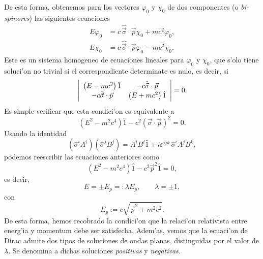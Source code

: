 De esta forma, obtenemos para los vectores $\varphi_0$ y $\chi_0$ de dos
componentes (o \textit{bi-spinores}) las siguientes ecuaciones
\begin{align}
E\varphi_0 & =c\,\hat{\vec{\sigma}}\cdot\vec{p}\chi_0+mc^2\varphi_0,
\label{s1}\\
E\chi_0 & =c\,\hat{\vec{\sigma}}\cdot\vec{p}\varphi_0-mc^2\chi_0 
\label{s2}.
\end{align}
Este es un sistema homogeneo de ecuaciones lineales para $\varphi_0$ y $\chi_0$,
que s'olo tiene soluci'on no trivial si el correspondiente determinate es nulo,
es decir, si
\begin{equation}
\left|
\begin{array}
[c]{cc}%
\left( E-mc^2\right) \hat{1} & -c\hat{\vec{\sigma}}\cdot\vec{p}\\
-c\hat{\vec{\sigma}}\cdot\vec{p} & \left( E+mc^2\right) \hat{1}%
\end{array}
\right|  =0 .
\end{equation} 
Es simple verificar que esta condici'on es equivalente a
\begin{equation}
\left( E^2-m^2c^{4}\right) \hat{1}-c^2\left(
\vec{\sigma}\cdot\vec{p}\right)^2 =0.
\end{equation} 
Usando la identidad
\begin{equation}\label{idsigma}
\left( \hat{\sigma}^iA^i\right) \left( \hat{\sigma}^{j}B^{j}\right)
=A^iB^i\hat{1}+i\varepsilon^{ijk}\,\hat{\sigma}^iA^{j}B^{k},
\end{equation} 
podemos reescribir las ecuaciones anteriores como
\begin{equation}
\left( E^2-m^2c^{4}\right) \hat{1}-c^2 \vec{p}^2\hat{1}  =0,
\end{equation} 
es decir, 
\begin{equation}
E=\pm E_{p}=:\lambda E_p, \qquad \lambda=\pm 1,
\end{equation}
con
\begin{equation}
E_{p}:=c\sqrt{{\vec p}^2+m^2c^2}.
\end{equation} 
De esta forma, hemos recobrado la condici'on que la relaci'on relativista entre
energ'ia y momentum debe ser satisfecha. Adem'as, vemos que la ecuaci'on de
Dirac admite dos tipos de soluciones de ondas planas, distinguidas por el valor
de $\lambda$. Se denomina a dichas soluciones \textit{positivas} y
\textit{negativas}.

